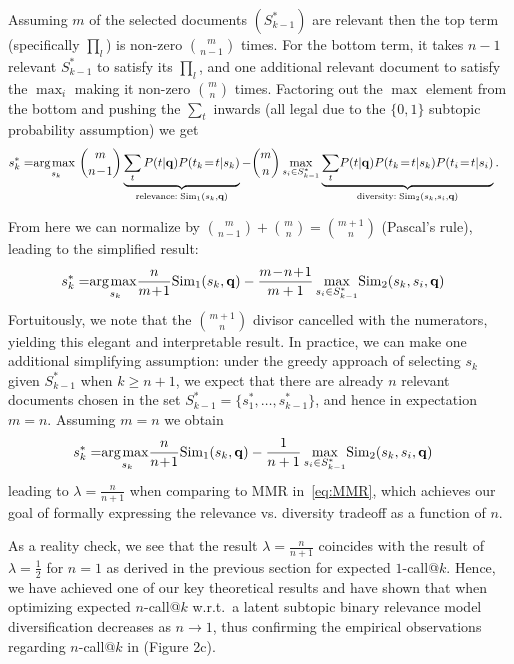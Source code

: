 Assuming $m$ of the selected documents $(S_{k-1}^*)$ are relevant 
then the top term
(specifically $\prod_l$) is non-zero $\binom{m}{n-1}$ times.  For the
bottom term, it takes $n-1$ relevant $S_{k-1}^*$ to satisfy its
$\prod_l$, and one additional relevant document to satisfy the
$\max_i$ making it non-zero $\binom{m}{n}$ times.  Factoring out the
$\max$ element from the bottom and pushing the $\sum_t$ inwards (all legal
due to the $\{0,1\}$ subtopic probability assumption) we get
\begin{align}
s_k^* = & \argmax_{s_k} \binom{m}{n\!-\!1} \underbrace{\sum_t P(t|\vec{q}) P(t_k\!=\!t|s_k)}_{\textrm{relevance}: \; \Sim_1(s_k,\vec{q})} - \binom{m}{n} \max_{s_i \in S_{k-1}^*} \underbrace{\sum_t \!P(t|\vec{q}) P(t_k\!=\!t|s_k) P(t_i\!=\!t|s_i)}_{\textrm{diversity}: \; \Sim_2(s_k,s_i,\vec{q})} \nonumber .
\end{align}  

From here we can 
normalize by $\binom{m}{n-1} + \binom{m}{n} = \binom{m+1}{n}$ 
(Pascal's rule), leading to the simplified result:
\begin{align}
s_k^* =  & \argmax_{s_k} \!\! \frac{n}{m\!+\!1} \Sim_1(s_k,\vec{q}) - \frac{m\!-\!n\!+\!1}{m+1} \max_{s_i \in S_{k-1}^*} \! \Sim_2(s_k,s_i,\vec{q}) \label{eq:ncall-result-almost}
\end{align}
Fortuitously, we note that the $\binom{m+1}{n}$ divisor cancelled with
the numerators, yielding this elegant and interpretable result.
In practice, we can make one additional
simplifying assumption: under the greedy approach of 
selecting $s_k$ given $S_{k-1}^*$ when $k \geq n + 1$, we expect that there are already $n$
relevant documents chosen in the set $S_{k-1}^* = \{s_1^*, \dots,
s_{k-1}^*\}$, and hence in expectation $m=n$.  Assuming $m = n$ we obtain 
\begin{align}
s_k^* =  & \argmax_{s_k} \!\! \frac{n}{n\!+\!1} \Sim_1(s_k,\vec{q}) - \frac{1}{n+1} \max_{s_i \in S_{k-1}^*} \! \Sim_2(s_k,s_i,\vec{q}) \label{eq:ncall-result}
\end{align}
leading to $\lambda = \frac{n}{n\!+\!1}$ when comparing to MMR
in~\eqref{eq:MMR}, which achieves our goal of formally expressing the
relevance vs. diversity tradeoff as a function of $n$.

As a reality check, we see that the result $\lambda = \frac{n}{n+1}$
coincides with the result of $\lambda=\frac{1}{2}$ for $n=1$ as
derived in the previous section for expected $1$-call@$k$.  Hence, we
have achieved one of our key theoretical results and have shown that
when optimizing expected $n$-call@$k$ w.r.t.\ a latent subtopic binary
relevance model diversification decreases as $n \to 1$, thus
confirming the empirical observations regarding $n$-call@$k$ in
\cite{wang09PortfolioTheory} (Figure 2c).

